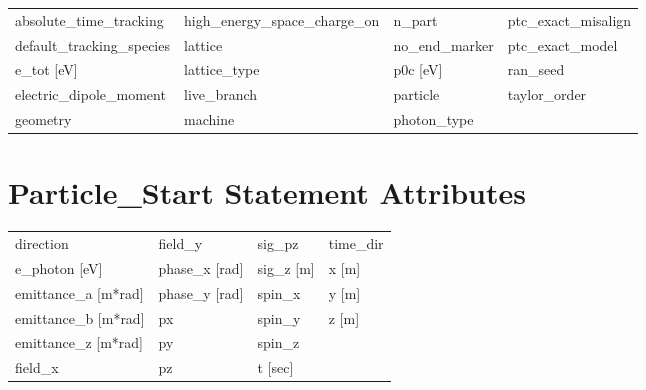  \begin{tabular}{llll} \toprule
absolute_time_tracking           & high_energy_space_charge_on      & n_part                           & ptc_exact_misalign               \\
default_tracking_species         & lattice                          & no_end_marker                    & ptc_exact_model                  \\
e_tot [eV]                       & lattice_type                     & p0c [eV]                         & ran_seed                         \\
electric_dipole_moment           & live_branch                      & particle                         & taylor_order                     \\
geometry                         & machine                          & photon_type                      &                                  \\
 \bottomrule
 \end{tabular}
 \vfill
 
 \section{Particle_Start Statement Attributes}
 \label{s:list.particle.start}
 
 \begin{tabular}{llll} \toprule
direction                        & field_y                          & sig_pz                           & time_dir                         \\
e_photon [eV]                    & phase_x [rad]                    & sig_z [m]                        & x [m]                            \\
emittance_a [m*rad]              & phase_y [rad]                    & spin_x                           & y [m]                            \\
emittance_b [m*rad]              & px                               & spin_y                           & z [m]                            \\
emittance_z [m*rad]              & py                               & spin_z                           &                                  \\
field_x                          & pz                               & t [sec]                          &                                  \\
 \bottomrule
 \end{tabular}
 \vfill
 
